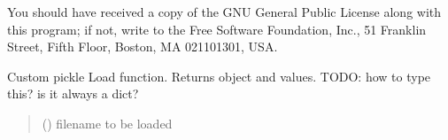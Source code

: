 \documentclass[letterpaper,10pt,english]{sphinxmanual}
\begin{document}
\sphinxAtStartPar
You should have received a copy of the GNU General Public License
along with this program; if not, write to the Free Software
Foundation, Inc., 51 Franklin Street, Fifth Floor, Boston, MA  02110\sphinxhyphen{}1301, USA.

\begin{fulllineitems}
\label{\detokenize{api/killMS.Other:killMS.Other.MyPickle.Load}}
\pysigstartsignatures
{}
\pysigstopsignatures
\sphinxAtStartPar
Custom pickle Load function. Returns object and values.
TODO: how to type this? is it always a dict?
\begin{quote}\begin{description}
\sphinxAtStartPar
{} () \textendash{} filename to be loaded

\sphinxAtStartPar
{}

\end{description}\end{quote}

\end{fulllineitems}

\end{document}
